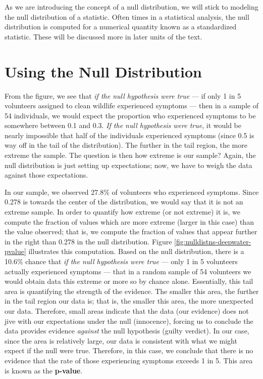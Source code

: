 \documentclass[
]{book}
\theoremstyle{plain}
\theoremstyle{mydefn}
\theoremstyle{myexmpl}
\theoremstyle{remark}
\begin{document}
As we are introducing the concept of a null distribution, we will stick to modeling the null distribution of a statistic. Often times in a statistical analysis, the null distribution is computed for a numerical quantity known as a standardized statistic. These will be discussed more in later units of the text.

\hypertarget{using-the-null-distribution}{%
\section{Using the Null Distribution}\label{using-the-null-distribution}}

From the figure, we see that \emph{if the null hypothesis were true} --- if only 1 in 5 volunteers assigned to clean wildlife experienced symptoms --- then in a sample of 54 individuals, we would expect the proportion who experienced symptoms to be somewhere between 0.1 and 0.3. \emph{If the null hypothesis were true}, it would be nearly impossible that half of the individuals experienced symptoms (since 0.5 is way off in the tail of the distribution). The further in the tail region, the more extreme the sample. The question is then how extreme is our sample? Again, the null distribution is just setting up expectations; now, we have to weigh the data against those expectations.

In our sample, we observed 27.8\% of volunteers who experienced symptoms. Since 0.278 is towards the center of the distribution, we would say that it is not an extreme sample. In order to quantify how extreme (or not extreme) it is, we compute the fraction of values which are more extreme (larger in this case) than the value observed; that is, we compute the fraction of values that appear further in the right than 0.278 in the null distribution. Figure \ref{fig:nulldistns-deepwater-pvalue} illustrates this computation. Based on the null distribution, there is a 10.6\% chance that \emph{if the null hypothesis were true} --- only 1 in 5 volunteers actually experienced symptoms --- that in a random sample of 54 volunteers we would obtain data this extreme or more so by chance alone. Essentially, this tail area is quantifying the strength of the evidence. The smaller this area, the further in the tail region our data is; that is, the smaller this area, the more unexpected our data. Therefore, small areas indicate that the data (our evidence) does not jive with our expectations under the null (innocence), forcing us to conclude the data provides evidence \emph{against} the null hypothesis (guilty verdict). In our case, since the area is relatively large, our data is consistent with what we might expect if the null were true. Therefore, in this case, we conclude that there is no evidence that the rate of those experiencing symptoms exceeds 1 in 5. This area is known as the \textbf{p-value}.
\end{document}
